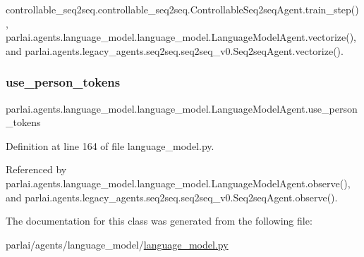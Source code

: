 controllable\+\_\+seq2seq.\+controllable\+\_\+seq2seq.\+Controllable\+Seq2seq\+Agent.\+train\+\_\+step(), parlai.\+agents.\+language\+\_\+model.\+language\+\_\+model.\+Language\+Model\+Agent.\+vectorize(), and parlai.\+agents.\+legacy\+\_\+agents.\+seq2seq.\+seq2seq\+\_\+v0.\+Seq2seq\+Agent.\+vectorize().

\mbox{\label{classparlai_1_1agents_1_1language__model_1_1language__model_1_1LanguageModelAgent_a4d8f28572b3ff9530e7ced7f4bc1d279}} 
\subsubsection{\texorpdfstring{use\+\_\+person\+\_\+tokens}{use\_person\_tokens}}
{\footnotesize\ttfamily parlai.\+agents.\+language\+\_\+model.\+language\+\_\+model.\+Language\+Model\+Agent.\+use\+\_\+person\+\_\+tokens}



Definition at line 164 of file language\+\_\+model.\+py.



Referenced by parlai.\+agents.\+language\+\_\+model.\+language\+\_\+model.\+Language\+Model\+Agent.\+observe(), and parlai.\+agents.\+legacy\+\_\+agents.\+seq2seq.\+seq2seq\+\_\+v0.\+Seq2seq\+Agent.\+observe().



The documentation for this class was generated from the following file\+:\begin{DoxyCompactItemize}
\item 
parlai/agents/language\+\_\+model/\hyperlink{language__model_8py}{language\+\_\+model.\+py}\end{DoxyCompactItemize}
